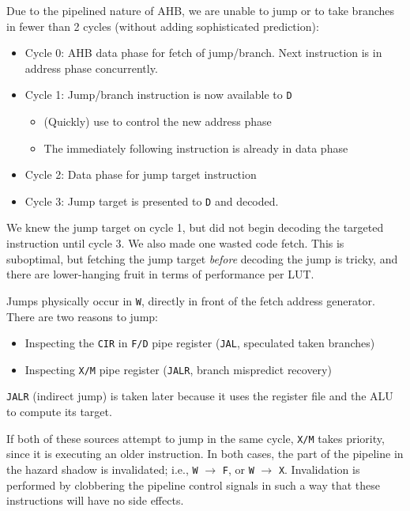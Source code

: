 \documentclass[notitlepage]{article}
\begin{document}
Due to the pipelined nature of AHB, we are unable to jump or to take branches in fewer than 2 cycles (without adding sophisticated prediction):

\begin{itemize}
\item Cycle 0: AHB data phase for fetch of jump/branch. Next instruction is in address phase concurrently.
\item Cycle 1: Jump/branch instruction is now available to {\tt D}
	\begin{itemize}
		\item (Quickly) use to control the new address phase
		\item The immediately following instruction is already in data phase
	\end{itemize}
\item Cycle 2: Data phase for jump target instruction
\item Cycle 3: Jump target is presented to {\tt D} and decoded.
\end{itemize}


We knew the jump target on cycle 1, but did not begin decoding the targeted instruction until cycle 3. We also made one wasted code fetch. This is suboptimal, but fetching the jump target {\it before} decoding the jump is tricky, and there are lower-hanging fruit in terms of performance per LUT.

Jumps physically occur in {\tt W}, directly in front of the fetch address generator. There are two reasons to jump:

\begin{itemize}
	\item Inspecting the {\tt CIR} in {\tt F/D} pipe register ({\tt JAL}, speculated taken branches)
	\item Inspecting {\tt X/M} pipe register ({\tt JALR}, branch mispredict recovery)
\end{itemize}

{\tt JALR} (indirect jump) is taken later because it uses the register file and the ALU to compute its target.

If both of these sources attempt to jump in the same cycle, {\tt X/M} takes priority, since it is executing an older instruction. In both cases, the part of the pipeline in the hazard shadow is invalidated; i.e., {\tt W} $\to$ {\tt F}, or {\tt W} $\to$ {\tt X}. Invalidation is performed by clobbering the pipeline control signals in such a way that these instructions will have no side effects.
\end{document}
